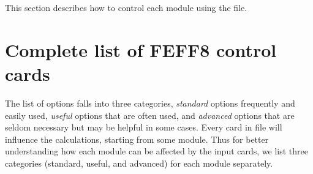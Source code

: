 \documentclass[11pt,oneside]{report} %
\begin{document}
This section describes how to control each module using the
 file.



\section{Complete list of FEFF8 control cards}
\label{sec:Complete-list-FEFF8}




The list of  options falls into three categories,
\textsl{standard} options frequently and easily used, \textsl{useful}
options that are often used, and \textsl{advanced} options that are
seldom necessary but may be helpful in some cases.  Every card in
 file will
influence the calculations, starting from some module. Thus for better
understanding how each module can be affected by the input cards, we
list three categories (standard, useful, and advanced) for each
module separately.
\end{document}
